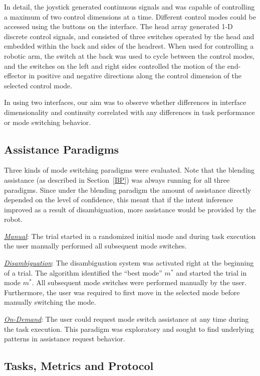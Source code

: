 \documentclass[conference]{IEEEtran}
\begin{document}
 In detail, the joystick generated continuous signals and was capable of controlling a maximum of two control dimensions at a time. Different control modes could be accessed using the buttons on the interface. 
 The head array generated 1-D discrete control signals, and consisted of three switches operated by the head and embedded within the back and sides of the headrest. When used for controlling a robotic arm, the switch at the back was used to cycle between the control modes, and the switches on the left and right sides controlled the motion of the end-effector in positive and negative directions along the control dimension of the selected control mode. 
 
 In using two interfaces, our aim was to observe whether differences in interface dimensionality and continuity correlated with any differences in task performance or mode switching behavior.
 
 \subsection{Assistance Paradigms}
 Three kinds of mode switching paradigms were evaluated. Note that the blending assistance (as described in Section~\ref{BP}) was always running for all three paradigms. Since under the blending paradigm the amount of assistance directly depended on the level of confidence, this meant that if the intent inference improved as a result of disambiguation, more assistance would be provided by the robot.
 
 \noindent\underline{\textit{Manual}}: The trial started in a randomized initial mode and during task execution the user manually performed all subsequent mode switches.
 
 \noindent\underline{\textit{Disambiguation}}: The disambiguation system was activated right at the beginning of a trial. The algorithm identified the ``best mode'' $m^*$ and started the trial in mode $m^*$. All subsequent mode switches were performed manually by the user. Furthermore, the user was required to first move in the selected mode before manually switching the mode. 
 
 \noindent\underline{\textit{On-Demand}}: The user could request mode switch assistance at any time during the task execution. This paradigm was exploratory and sought to find underlying patterns in assistance request behavior.
 
\subsection{Tasks, Metrics and Protocol}
\end{document}
